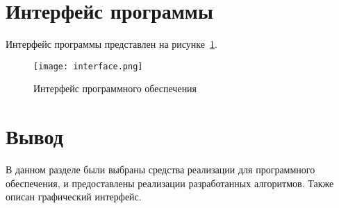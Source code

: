 \clearpage

\section{Интерфейс программы}

Интерфейс программы представлен на рисунке~\ref{fig:interface}.

\begin{figure}[H]
	\centering
	\texttt{[image: interface.png]}
	\caption{Интерфейс программного обеспечения}
	\label{fig:interface}
\end{figure}

\section*{Вывод}

В данном разделе были выбраны средства реализации для программного обеспечения, и предоставлены реализации разработанных алгоритмов. Также описан графический интерфейс.